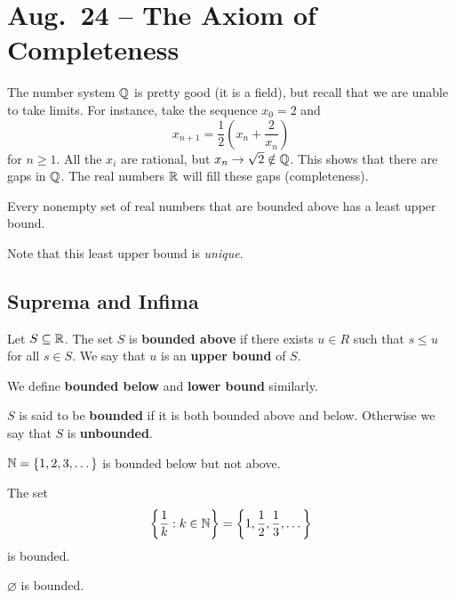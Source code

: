 \chapter{Aug.~24 -- The Axiom of Completeness}

The number system $\mathbb{Q}$ is pretty good (it is a field),
but recall that we are unable to take limits. For
instance, take the sequence $x_0 = 2$ and
\[x_{n+1} = \frac{1}{2}\left(x_n + \frac{2}{x_n}\right)\]
for $n \ge 1$. All the $x_i$ are rational, but
$x_n \to \sqrt{2} \notin \mathbb{Q}$. This shows that there are
gaps in $\mathbb{Q}$. The real numbers $\mathbb{R}$ will fill
these gaps (completeness).

\begin{axiom}
Every nonempty set of real numbers that are bounded
above has a least upper bound.
\end{axiom}

Note that this least upper bound is \textit{unique}.

\section{Suprema and Infima}

\begin{definition}
  Let $S \subseteq \mathbb{R}$. The set $S$ is
  \textbf{bounded above} if there exists $u \in R$
  such that  $s \le u$ for all $s \in S$.
  We say that $u$ is an \textbf{upper bound} of $S$.
\end{definition}

We define \textbf{bounded below} and \textbf{lower bound}
similarly.

\begin{definition}
  $S$ is said to be \textbf{bounded} if it is
  both bounded above and below. Otherwise we say that
  $S$ is \textbf{unbounded}.
\end{definition}

\begin{example}
  $\mathbb{N} = \{1, 2, 3, \dots\}$ is bounded below but not
  above.
\end{example}

\begin{example}
  The set
  \[\left\{\frac{1}{k} : k \in \mathbb{N}\right\} = \left\{1, \frac{1}{2}, \frac{1}{3}, \dots\right\}\]
  is bounded.
\end{example}

\begin{example}
  $\varnothing$ is bounded.
\end{example}

